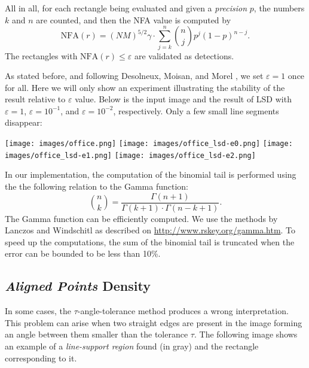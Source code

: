 \documentclass{ipol}
\begin{document}
All in all, for each rectangle being evaluated and given
a \emph{precision} $p$, the numbers $k$ and $n$ are counted, and then
the NFA value is computed by
$$
   \textrm{NFA}(r) = (NM)^{5/2}\gamma \cdot
                                  \sum_{j=k}^{n}\binom{n}{j}p^j(1-p)^{n-j}.
$$
The rectangles with $\textrm{NFA}(r)\leq\varepsilon$ are validated as
detections.

As stated before, and following Desolneux, Moisan, and
Morel \cite{dmm2000,dmm2008}, we set $\varepsilon=1$ once for
all. Here we will only show an experiment illustrating the stability
of the result relative to $\varepsilon$ value. Below is the input
image and the result of LSD with $\varepsilon=1$,
$\varepsilon=10^{-1}$, and $\varepsilon=10^{-2}$, respectively. Only a
few small line segments disappear:

\begin{center}
\texttt{[image: images/office.png]}
\texttt{[image: images/office\_lsd-e0.png]}
\texttt{[image: images/office\_lsd-e1.png]}
\texttt{[image: images/office\_lsd-e2.png]}
\end{center}

In our implementation, the computation of the binomial tail is
performed using the the following relation to the Gamma function:
$$
   \binom{n}{k} = \frac{\Gamma(n+1)}{\Gamma(k+1)\cdot\Gamma(n-k+1)}.
$$
The Gamma function can be efficiently computed. We use the methods by
Lanczos and Windschitl as described
on \url{http://www.rskey.org/gamma.htm}. To speed up the computations,
the sum of the binomial tail is truncated when the error can be
bounded to be less than 10\%.


\subsection{\emph{Aligned Points} Density}

In some cases, the $\tau$-angle-tolerance method produces a wrong
interpretation. This problem can arise when two straight edges are
present in the image forming an angle between them smaller than the
tolerance $\tau$. The following image shows an example of
a \emph{line-support region} found (in gray) and the rectangle
corresponding to it.
\end{document}

